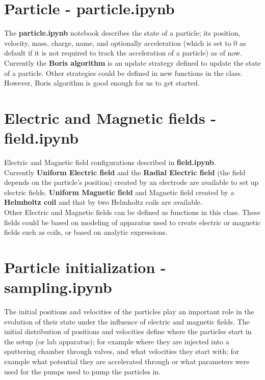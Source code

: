 \documentclass[12pt]{article}
\begin{document}
{		
		
		\section{Particle - particle.ipynb}
		The \textbf{particle.ipynb} notebook describes the state of a particle; its position, velocity, mass, charge, name, and optionally acceleration (which is set to 0 as default if it is not required to track the acceleration of a particle) as of now. \\
		
		\noindent Currently the \textbf{Boris algorithm} is an update strategy defined to update the state of a particle. Other strategies could be defined in new functions in the class. However, Boris algorithm is good enough for us to get started.
		
		
		
		\section{Electric and Magnetic fields - field.ipynb}
		Electric and Magnetic field configurations described in \textbf{field.ipynb}. \\
		
		\noindent Currently \textbf{Uniform Electric field} and the \textbf{Radial Electric field} (the field depends on the particle's position) created by an electrode are available to set up electric fields. \textbf{Uniform Magnetic field} and Magnetic field created by a \textbf{Helmholtz coil} and that by two Helmholtz coils are available. \\
		
		\noindent Other Electric and Magnetic fields can be defined as functions in this class. These fields could be based on modeling of apparatus used to create electric or magnetic fields such as coils, or based on analytic expressions.
		
		
		
		
		
		\section{Particle initialization - sampling.ipynb}
		The initial positions and velocities of the particles play an important role in the evolution of their state under the influence of electric and magnetic fields. The initial distribution of positions and velocities define where the particles start in the setup (or lab apparatus); for example where they are injected into a sputtering chamber through valves, and what velocities they start with; for example what potential they are accelerated through or what parameters were used for the pumps used to pump the particles in.\\
		
}
\end{document}
